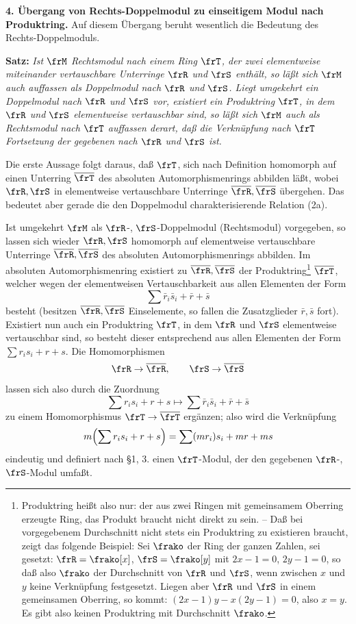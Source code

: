 \noindent\textbf{4. Übergang von Rechts-Doppelmodul zu einseitigem Modul nach Produktring.} Auf diesem Übergang beruht wesentlich die Bedeutung des Rechts-Doppelmoduls.

\noindent\textbf{Satz:} \emph{Ist \(\frM\) Rechtsmodul nach einem Ring \(\frT\), der zwei elementweise miteinander vertauschbare Unterringe \(\frR\) und \(\frS\) enthält, so läßt sich \(\frM\) auch auffassen als Doppelmodul nach \(\frR\) und \(\frS\). Liegt umgekehrt ein Doppelmodul nach \(\frR\) und \(\frS\) vor, existiert ein Produktring \(\frT\), in dem \(\frR\) und \(\frS\) elementweise vertauschbar sind, so läßt sich \(\frM\) auch als Rechtsmodul nach \(\frT\) auffassen derart, daß die Verknüpfung nach \(\frT\) Fortsetzung der gegebenen nach \(\frR\) und \(\frS\) ist.}

Die erste Aussage folgt daraus, daß \(\frT\), sich nach Definition homomorph auf einen Unterring \(\overline{\frT}\) des absoluten Automorphismenrings abbilden läßt, wobei \(\frR,\frS\) in elementweise vertauschbare Unterringe \(\overline{\frR},\overline{\frS}\) übergehen. Das bedeutet aber gerade die den Doppelmodul charakterisierende Relation (2a).

Ist umgekehrt \(\frM\) als \(\frR\)-, \(\frS\)-Doppelmodul (Rechtsmodul) vorgegeben, so lassen sich wieder \(\frR,\frS\) homomorph auf elementweise vertauschbare Unterringe \(\overline{\frR},\overline{\frS}\) des absoluten Automorphismenrings abbilden. Im absoluten Automorphismenring existiert zu \(\overline{\frR},\overline{\frS}\) der Produktring\footnote{Produktring heißt also nur: der aus zwei Ringen mit gemeinsamem Oberring erzeugte Ring, das Produkt braucht nicht direkt zu sein. -- Daß bei vorgegebenem Durchschnitt nicht stets ein Produktring zu existieren braucht, zeigt das folgende Beispiel: Sei \(\frako\) der Ring der ganzen Zahlen, sei gesetzt: \(\frR=\frako[x]\), \(\frS=\frako[y]\) mit \(2x-1=0\), \(2y-1=0\), so daß also \(\frako\) der Durchschnitt von \(\frR\) und \(\frS\), wenn zwischen \(x\) und \(y\) keine Verknüpfung festgesetzt. Liegen aber \(\frR\) und \(\frS\) in einem gemeinsamen Oberring, so kommt: \((2x-1)y-x(2y-1)=0\), also \(x=y\). Es gibt also keinen Produktring mit Durchschnitt \(\frako\).} \(\overline{\frT}\), welcher wegen der elementweisen Vertauschbarkeit aus allen Elementen der Form
\[
        \sum \bar r_i\bar s_i+\bar r+\bar s
\]
besteht (besitzen \(\overline{\frR},\overline{\frS}\) Einselemente, so fallen die Zusatzglieder \(\bar r,\bar s\) fort). Existiert nun auch ein Produktring \(\frT\), in dem \(\frR\) und \(\frS\) elementweise vertauschbar sind, so besteht dieser entsprechend aus allen Elementen der Form \(\sum r_i s_i+r+s\). Die Homomorphismen
\[
        \frR\to\overline{\frR},\qquad \frS\to\overline{\frS}
\]
lassen sich also durch die Zuordnung
\[
        \sum r_i s_i+r+s
        \longmapsto
        \sum \bar r_i\bar s_i+\bar r+\bar s
\]
zu einem Homomorphismus \(\frT\to\overline{\frT}\) ergänzen; also wird die Verknüpfung
\[
        m\Bigl(\sum r_i s_i+r+s\Bigr)
        =\sum (m r_i)s_i+m r+m s
\]
eindeutig und definiert nach §1, 3. einen \(\frT\)-Modul, der den gegebenen \(\frR\)-, \(\frS\)-Modul umfaßt.

